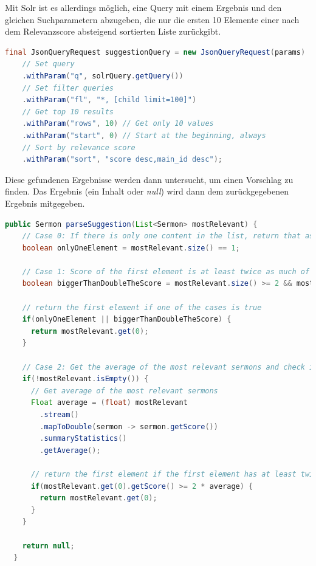 Mit Solr ist es allerdings möglich, eine Query mit einem Ergebnis und den gleichen Suchparametern abzugeben, die nur die ersten 10 Elemente einer nach dem Relevanzscore absteigend sortierten Liste zurückgibt.

\begin{lstlisting}[language=Java, label={code:SOLRSuggestionQuery}, title={Solr Query für die Top 10 Ergebnisse, absteigend sortiert nach Relevanz \cite{solr-search2022}}]
  final JsonQueryRequest suggestionQuery = new JsonQueryRequest(params)
    // Set query
    .withParam("q", solrQuery.getQuery())
    // Set filter queries
    .withParam("fl", "*, [child limit=100]")
    // Get top 10 results
    .withParam("rows", 10) // Get only 10 values
    .withParam("start", 0) // Start at the beginning, always
    // Sort by relevance score
    .withParam("sort", "score desc,main_id desc");
\end{lstlisting}

Diese gefundenen Ergebnisse werden dann untersucht, um einen Vorschlag zu finden. Das Ergebnis (ein Inhalt oder \emph{null}) wird dann dem zurückgegebenen Ergebnis mitgegeben.

\begin{lstlisting}[language=Java, label={code:parseSuggestion}, title={Relevanteste Inhalte nach einem Vorschlag durchsuchen \cite{solr-search2022}}]
  public Sermon parseSuggestion(List<Sermon> mostRelevant) {
    // Case 0: If there is only one content in the list, return that as suggestion
    boolean onlyOneElement = mostRelevant.size() == 1;

    // Case 1: Score of the first element is at least twice as much of the second score
    boolean biggerThanDoubleTheScore = mostRelevant.size() >= 2 && mostRelevant.get(0).getScore() >= 2 * mostRelevant.get(1).getScore();

    // return the first element if one of the cases is true
    if(onlyOneElement || biggerThanDoubleTheScore) {
      return mostRelevant.get(0);
    }

    // Case 2: Get the average of the most relevant sermons and check if the first has at least twice as much of that
    if(!mostRelevant.isEmpty()) {
      // Get average of the most relevant sermons
      Float average = (float) mostRelevant
        .stream()
        .mapToDouble(sermon -> sermon.getScore())
        .summaryStatistics()
        .getAverage();

      // return the first element if the first element has at least twice as much of the average
      if(mostRelevant.get(0).getScore() >= 2 * average) {
        return mostRelevant.get(0);
      }
    }

    return null;
  }
\end{lstlisting}


